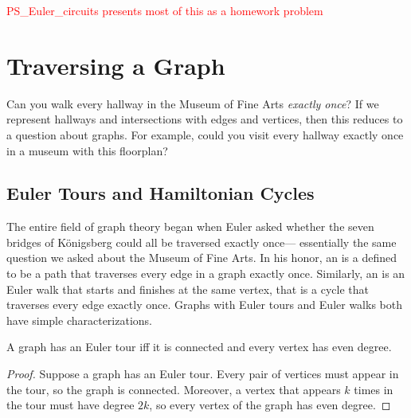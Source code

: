 \begin{staffnotes}

\textcolor{red}{PS\_Euler\_circuits presents most of this as a homework problem}

\section{Traversing a Graph}
Can you walk every hallway in the Museum of Fine Arts {\em exactly
once}?  If we represent hallways and intersections with edges and
vertices, then this reduces to a question about graphs.  For example,
could you visit every hallway exactly once in a museum with this
floorplan?


\subsection{Euler Tours and Hamiltonian Cycles}

The entire field of graph theory began when Euler asked whether the seven
bridges of K\"onigsberg could all be traversed exactly once--- essentially
the same question we asked about the Museum of Fine Arts.  In his honor,
an  is a defined to be a path that traverses every edge
in a graph exactly once.  Similarly, an  is an Euler walk
that starts and finishes at the same vertex, that is a cycle that
traverses every edge exactly once.  Graphs with Euler tours and Euler
walks both have simple characterizations.
\begin{theorem}
A graph has an Euler tour iff it is connected and every vertex has even
degree.
\end{theorem}
\begin{proof}
Suppose a graph has an Euler tour.  Every pair of vertices must appear in
the tour, so the graph is connected.  Moreover, a vertex that appears $k$
times in the tour must have degree $2k$, so every vertex of the graph has
even degree.


\end{proof}
\end{staffnotes}
